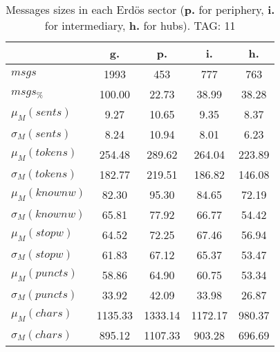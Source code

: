 \begin{table}[h!]
\begin{center}
\begin{tabular}{| l || c | c | c | c |}\hline
 & {\bf g.} & {\bf p.} & {\bf i.} & {\bf h.} \\\hline\hline
$msgs$ & 1993  & 453  & 777  & 763 \\
$msgs_{\%}$ & 100.00  & 22.73  & 38.99  & 38.28 \\\hline
$\mu_M(sents)$ & 9.27  & 10.65  & 9.35  & 8.37 \\
$\sigma_M(sents)$ & 8.24  & 10.94  & 8.01  & 6.23 \\\hline
$\mu_M(tokens)$ & 254.48  & 289.62  & 264.04  & 223.89 \\
$\sigma_M(tokens)$ & 182.77  & 219.51  & 186.82  & 146.08 \\\hline
$\mu_M(knownw)$ & 82.30  & 95.30  & 84.65  & 72.19 \\
$\sigma_M(knownw)$ & 65.81  & 77.92  & 66.77  & 54.42 \\\hline
$\mu_M(stopw)$ & 64.52  & 72.25  & 67.46  & 56.94 \\
$\sigma_M(stopw)$ & 61.83  & 67.12  & 65.37  & 53.47 \\\hline
$\mu_M(puncts)$ & 58.86  & 64.90  & 60.75  & 53.34 \\
$\sigma_M(puncts)$ & 33.92  & 42.09  & 33.98  & 26.87 \\\hline
$\mu_M(chars)$ & 1135.33  & 1333.14  & 1172.17  & 980.37 \\
$\sigma_M(chars)$ & 895.12  & 1107.33  & 903.28  & 696.69 \\\hline
\end{tabular}
\caption{Messages sizes in each Erd\"os sector ({{\bf p.}} for periphery, {{\bf i.}} for intermediary, {{\bf h.}} for hubs). TAG: 11}
\end{center}
\end{table}